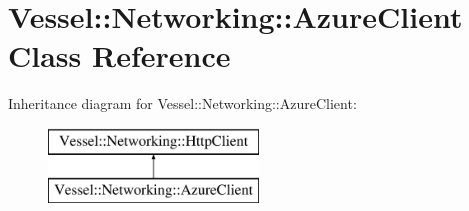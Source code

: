 \hypertarget{class_vessel_1_1_networking_1_1_azure_client}{}\section{Vessel\+:\+:Networking\+:\+:Azure\+Client Class Reference}
\label{class_vessel_1_1_networking_1_1_azure_client}
Inheritance diagram for Vessel\+:\+:Networking\+:\+:Azure\+Client\+:\begin{figure}[H]
\begin{center}
\leavevmode
\includegraphics[height=2.000000cm]{class_vessel_1_1_networking_1_1_azure_client}
\end{center}
\end{figure}
